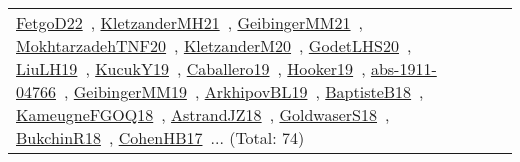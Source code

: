 {\begin{longtable}{lp{3cm}>{\raggedright\arraybackslash}p{6cm}>{\raggedright\arraybackslash}p{6cm}>{\raggedright\arraybackslash}p{8cm}}
\href{../works/FetgoD22.pdf}{FetgoD22}~\cite{FetgoD22}, \href{../works/KletzanderMH21.pdf}{KletzanderMH21}~\cite{KletzanderMH21}, \href{../works/GeibingerMM21.pdf}{GeibingerMM21}~\cite{GeibingerMM21}, \href{../works/MokhtarzadehTNF20.pdf}{MokhtarzadehTNF20}~\cite{MokhtarzadehTNF20}, \href{../works/KletzanderM20.pdf}{KletzanderM20}~\cite{KletzanderM20}, \href{../works/GodetLHS20.pdf}{GodetLHS20}~\cite{GodetLHS20}, \href{../works/LiuLH19.pdf}{LiuLH19}~\cite{LiuLH19}, \href{../works/KucukY19.pdf}{KucukY19}~\cite{KucukY19}, \href{../works/Caballero19.pdf}{Caballero19}~\cite{Caballero19}, \href{../works/Hooker19.pdf}{Hooker19}~\cite{Hooker19}, \href{../works/abs-1911-04766.pdf}{abs-1911-04766}~\cite{abs-1911-04766}, \href{../works/GeibingerMM19.pdf}{GeibingerMM19}~\cite{GeibingerMM19}, \href{../works/ArkhipovBL19.pdf}{ArkhipovBL19}~\cite{ArkhipovBL19}, \href{../works/BaptisteB18.pdf}{BaptisteB18}~\cite{BaptisteB18}, \href{../works/KameugneFGOQ18.pdf}{KameugneFGOQ18}~\cite{KameugneFGOQ18}, \href{../works/AstrandJZ18.pdf}{AstrandJZ18}~\cite{AstrandJZ18}, \href{../works/GoldwaserS18.pdf}{GoldwaserS18}~\cite{GoldwaserS18}, \href{../works/BukchinR18.pdf}{BukchinR18}~\cite{BukchinR18}, \href{../works/CohenHB17.pdf}{CohenHB17}~\cite{CohenHB17}... (Total: 74)\\
\end{longtable}
}

